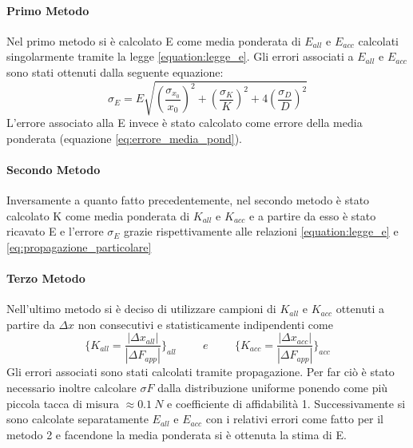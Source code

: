 \documentclass[a4paper,11pt,oneside]{article}
\begin{document}
\paragraph{Primo Metodo} Nel primo metodo si è calcolato E come media ponderata di $E_{all}$ e $E_{acc}$ calcolati singolarmente tramite la legge \ref{equation:legge_e}. Gli errori associati a $E_{all}$ e $E_{acc}$ sono stati ottenuti dalla seguente equazione:
\begin{equation*}
    \sigma_{E} = E\sqrt{\left(\frac{\sigma_{x_{0}}}{x_{0}}\right)^2+\left(\frac{\sigma_{K}}{K}\right)^2+4\left(\frac{\sigma_{D}}{D}\right)^2}
    \label{eq:propagazione_particolare}
\end{equation*}
L'errore associato alla E invece è stato calcolato come errore della media ponderata (equazione \ref{eq:errore_media_pond}).

\paragraph{Secondo Metodo} Inversamente a quanto fatto precedentemente, nel secondo metodo è stato calcolato K come media ponderata di $K_{all}$ e $K_{acc}$ e a partire da esso è stato ricavato E e l'errore $\sigma_{E}$ grazie rispettivamente alle relazioni \ref{equation:legge_e} e \ref{eq:propagazione_particolare}

\paragraph{Terzo Metodo} Nell'ultimo metodo si è deciso di utilizzare campioni di $K_{all}$ e $K_{acc}$ ottenuti a partire da $\Delta x$  non consecutivi e statisticamente indipendenti come 
\begin{equation*}
    \biggl\{ K_{all} = \frac{|\Delta x_{all}|}{|\Delta F_{app}|}\biggr\}_{all}
    \hspace{1cm} e \hspace{1cm}
    \biggl\{ K_{acc} = \frac{|\Delta x_{acc}|}{|\Delta F_{app}|}\biggr\}_{acc}
\end{equation*}
Gli errori associati sono stati calcolati tramite propagazione. Per far ciò è stato necessario inoltre calcolare $\sigma F$ dalla distribuzione uniforme ponendo come più piccola tacca di misura $\approx \SI{0.1}{N}$ e coefficiente di affidabilità 1. Successivamente si sono calcolate separatamente $E_{all}$ e $E_{acc}$ con i relativi errori come fatto per il metodo 2 e facendone la media ponderata si è ottenuta la stima di E.
\end{document}
